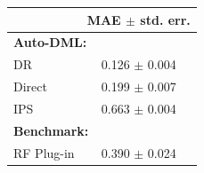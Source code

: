 \begin{tabular}{lc} 
\toprule 
& MAE $\pm$ std. err. \\ 
\midrule 
\multicolumn{2}{l}{\textbf{Auto-DML:}} \\ 
DR & 0.126 $\pm$ 0.004 \\ 
Direct & 0.199 $\pm$ 0.007 \\ 
IPS & 0.663 $\pm$ 0.004 \\ 
\midrule 
\multicolumn{2}{l}{\textbf{Benchmark:}} \\ 
RF Plug-in & 0.390 $\pm$ 0.024 \\ 
\bottomrule 
 \end{tabular}